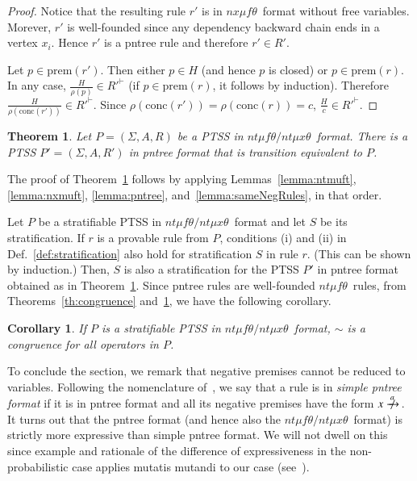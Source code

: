 \documentclass[submission,copyright,creativecommons]{eptcs}
\newtheorem{theorem}{Theorem}
\newtheorem{corollary}{Corollary}
\newcommand{\trans}[1][]{\xrightarrow{\, {#1} \, }}
\newcommand{\ntrans}[1][]{\mathrel{{\trans[#1]}\makebox[0em][r]{$\not$\hspace{2ex}}}{\!}}
\newcommand{\prem}[1]{\textrm{prem}(#1)}
\newcommand{\conc}[1]{\textrm{conc}(#1)}
\newcommand{\ntmuft}{\ensuremath{\textit{nt}\mu\textit{f}\theta}}
\newcommand{\ntmuxt}{\ensuremath{\textit{nt}\mu\textit{x}\theta}}
\newcommand{\ntmufxt}{\ensuremath{\ntmuft\textit{/}\ntmuxt}}
\newcommand{\nxmuft}{\ensuremath{\textit{nx}\mu\textit{f}\theta}}
\newcommand{\colorpar}[3]{\colorbox{#1}{\parbox{#2}{#3}}}
\newcommand{\marginremark}[3]{\marginpar{\colorpar{#2}{\linewidth}{\color{#1}#3}}}
\newcommand{\remarkDG}[1]{\marginremark{darkgreen}{lightyellow}{\tiny{[DG]~ #1}}}
\newcommand{\bisim}{\sim}
\newcommand{\proves}{\vdash}
\renewcommand{\remarkDG}[1]{}
\begin{document}
\begin{proof}
 Notice that the resulting rule $r'$ is in \nxmuft\ format without
 free variables.  Morever, $r'$ is well-founded since any dependency
 backward chain ends in a vertex $x_i$.  Hence $r'$ is a pntree rule
 and therefore $r'\in R'$.

 Let $p\in\prem{r'}$. Then either $p\in H$ (and hence $p$ is closed)
 or $p\in\prem{r}$. In any case, $\frac{H}{\rho(p)}\in {R'}^\proves$
 (if $p\in\prem{r}$, it follows by induction). Therefore
 $\frac{H}{\rho(\conc{r'})}\in {R'}^\proves$.  Since
 $\rho(\conc{r'})=\rho(\conc{r})=c$, $\frac{H}{c}\in {R'}^\proves$.
\end{proof}









\begin{theorem}\label{th:ntumufxtPNTree}
 Let $P = (\Sigma, A, R)$ be a PTSS in \ntmufxt\ format. There is a 
 PTSS $P' = (\Sigma, A, R')$ in pntree format that is transition equivalent to $P$.
\end{theorem}

The proof of Theorem~\ref{th:ntumufxtPNTree} follows by applying
Lemmas~\ref{lemma:ntmuft}, \ref{lemma:nxmuft}, \ref{lemma:pntree},
and~\ref{lemma:sameNegRules}, in that order.

Let $P$ be a stratifiable PTSS in \ntmufxt\ format and let $S$ be its
stratification.
If $r$ is a provable rule from $P$, conditions (i) and (ii) in
Def.~\ref{def:stratification} also hold for stratification $S$ in rule
$r$.  (This can be shown by induction.)
Then, $S$ is also a stratification for the PTSS $P'$ in pntree format
obtained as in Theorem~\ref{th:ntumufxtPNTree}.
Since pntree rules are well-founded \ntmuft\ rules, from
Theorems~\ref{th:congruence} and~\ref{th:ntumufxtPNTree}, we have the
following corollary.

\begin{corollary}  
 If $P$ is a stratifiable PTSS in $\ntmufxt$\ format, $\bisim$ is a congruence for all operators in $P$.
\end{corollary}
\remarkDG{Even if it is a straight forward conclusion from the earlier propositions should we really just use corollary for this main theorem/main result of the paper (beside the technical machinery developed)? Maybe some of the earlier theorems should become only propositions?}

To conclude the section, we remark that negative premises cannot be
reduced to variables.
Following the nomenclature of~\cite{FokkinkvanGlabbeek96}, we say that
a rule is in \emph{simple pntree format} if it is in pntree format and
all its negative premises have the form $x \ntrans[a]$.
It turns out that the pntree format (and hence also the
\ntmufxt\ format) is strictly more expressive than simple pntree
format.
We will not dwell on this since example and rationale of the
difference of expressiveness in the non-probabilistic case applies
mutatis mutandi to our case (see~\cite{FokkinkvanGlabbeek96}).
\end{document}
